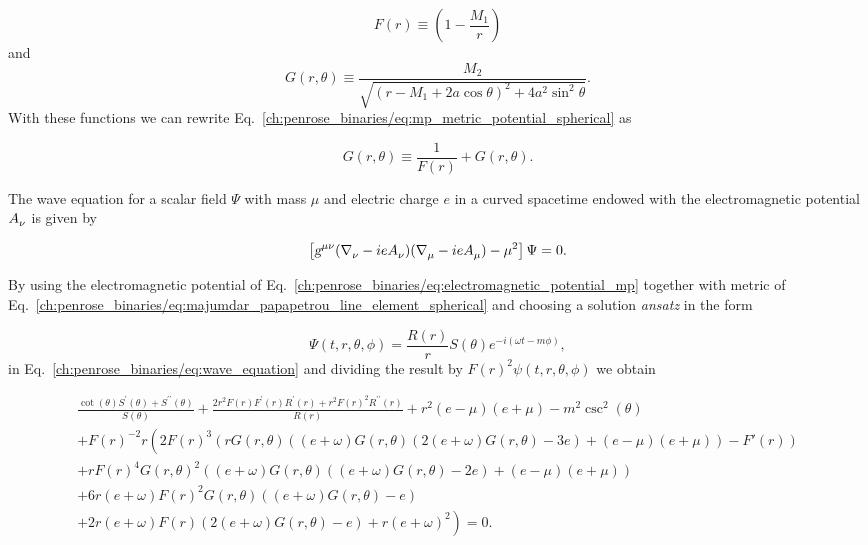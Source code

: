 \begin{equation}
  F(r) \equiv \left(1 - \frac{M_1}{r} \right)
  \label{ch:penrose_binaries/eq:part_f_of_u}
\end{equation}
%
and
\begin{equation}
  G(r,\theta) \equiv \frac{M_2}{\sqrt{(r - M_1 + 2a\cos\theta)^2 + 4a^2\sin^2\theta}}.
  \label{ch:penrose_binaries/eq:part_g_of_u}
\end{equation}
%
With these functions we can rewrite Eq.~\eqref{ch:penrose_binaries/eq:mp_metric_potential_spherical} as

\begin{equation}
  G(r,\theta) \equiv \frac{1}{F(r)} + G(r,\theta).
  \label{ch:penrose_binaries/eq:rewrite_of_u}
\end{equation}

The wave equation for a scalar field $\Psi$ with mass $\mu$ and electric charge $e$ in a curved spacetime endowed with the electromagnetic potential $\tens{A}{}{\nu}$ is given by

\begin{equation}
  \left[ \umtrtens{\mu}{\nu}(\tens{\nabla}{}{\nu} - ie\tens{A}{}{\nu})(\tens{\nabla}{}{\mu} - ie\tens{A}{}{\mu}) - \mu^2 \right]\Psi = 0.
  \label{ch:penrose_binaries/eq:wave_equation}
\end{equation}

By using the electromagnetic potential of Eq.~\eqref{ch:penrose_binaries/eq:electromagnetic_potential_mp} together with metric of Eq.~\eqref{ch:penrose_binaries/eq:majumdar_papapetrou_line_element_spherical} and choosing a solution \emph{ansatz} in the form

\begin{equation}
  \Psi(t,r,\theta,\phi) = \frac{R(r)}{r}S(\theta)e^{-i(\omega t - m\phi)},
  \label{ch:penrose_binaries/eq:rewrite_of_u}
\end{equation}
%
in Eq.~\eqref{ch:penrose_binaries/eq:wave_equation} and dividing the result by $F(r)^2 \psi (t,r,\theta ,\phi )$ we obtain

\begin{multline}
  \frac{\cot (\theta ) S^\prime(\theta )+S^{\prime\prime}(\theta )}{S(\theta )} + \frac{2 r^2 F(r) F^{\prime}(r) R^{\prime}(r)+r^2 F(r)^2 R^{\prime\prime}(r)}{R(r)} + r^2 (e-\mu ) (e+\mu )-m^2 \csc ^2(\theta ) \\
  + F(r)^{-2}r \left(2 F(r)^3 \left(r G(r,\theta ) ((e+\omega ) G(r,\theta ) (2 (e+\omega ) G(r,\theta )-3 e)+(e-\mu ) (e+\mu ))-F'(r)\right) \right. \\
  +r F(r)^4 G(r,\theta )^2 ((e+\omega ) G(r,\theta ) ((e+\omega ) G(r,\theta )-2 e)+(e-\mu ) (e+\mu ))\\
  +6 r (e+\omega ) F(r)^2 G(r,\theta ) ((e+\omega ) G(r,\theta )-e)\\
  \left. +2 r (e+\omega ) F(r) (2 (e+\omega ) G(r,\theta )-e)+r (e+\omega )^2\right) = 0.
  \label{ch:penrose_binaries/eq:unseparated_wave_eq}
\end{multline}

